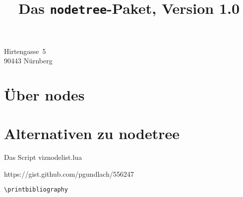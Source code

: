 \documentclass[ngerman]{dtk}
\begin{document}
\title{Das \texttt{nodetree}-Paket, Version 1.0}
    {Hirtengasse~5\\
     90443 Nürnberg\\
     }
\maketitle

\section{Über nodes}

\section{Alternativen zu nodetree}

Das Script viznodelist.lua

https://gist.github.com/pgundlach/556247


\begin{lstlisting}[style=number]
\printbibliography
\end{lstlisting}

\nocite{*}
\printbibliography
\end{document}

